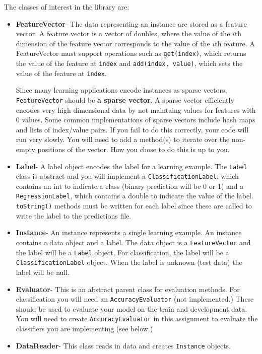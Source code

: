 \documentclass[11pt]{article}
\begin{document}
The classes of interest in the library are:
\begin{itemize}
\item {\bf FeatureVector}- The data representing an instance are stored as a feature vector. A feature vector is a vector of doubles, where the value of the $i$th dimension of the feature vector corresponds to the value of the $i$th feature. A FeatureVector must support operations such as {\tt get(index)}, which returns the value of the feature at {\tt index} and {\tt add(index, value)}, which sets the value of the feature at {\tt index}.

Since many learning applications encode instances as sparse vectors, {\tt FeatureVector} should be {\bf a sparse vector}. A sparse vector efficiently encodes very high dimensional data by not maintaing values for features with 0 values. Some common implementations of sparse vectors include hash maps and lists of index/value pairs. If you fail to do this correctly, your code will run very slowly. You will need to add a method(s) to iterate over the non-empty positions of the vector. How you chose to do this is up to you.

\item {\bf Label}- A label object encodes the label for a learning example. The {\tt Label} class is abstract and you will implement a {\tt ClassificationLabel}, which contains an int to indicate a class (binary prediction will be 0 or 1) and a {\tt RegressionLabel}, which contains a double to indicate the value of the label. {\tt toString()} methods must be written for each label since these are called to write the label to the predictions file.

\item {\bf Instance}- An instance represents a single learning example. An instance contains a data object and a label. The data object is a {\tt FeatureVector} and the label will be a {\tt Label} object. For classification, the label will be a {\tt ClassificationLabel} object. When the label is unknown (test data) the label will be null.

\item {\bf Evaluator}- This is an abstract parent class for evaluation methods. For classification you will need an {\tt AccuracyEvaluator} (not implemented.) 
These should be used to evaluate your model on the train and development data. You will need to create {\tt AccuracyEvaluator} in this assignment to 
evaluate the classifiers you are implementing (see below.)

\item {\bf DataReader}- This class reads in data and creates {\tt Instance} objects.


\end{itemize}
\end{document}
